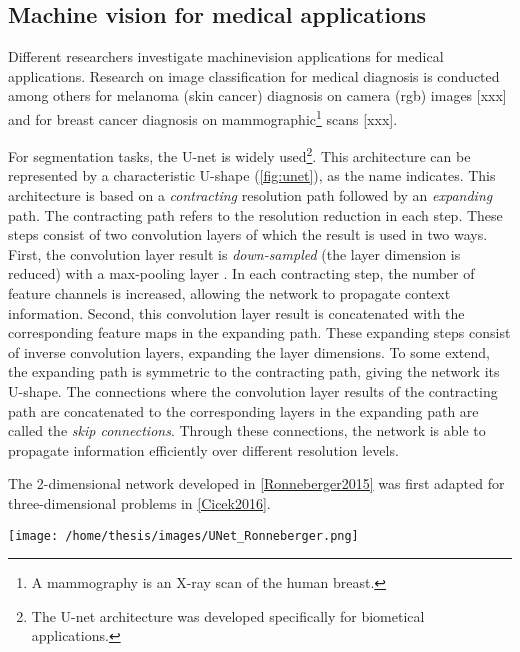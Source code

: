 \subsection{Machine vision for medical applications}
\par{
    Different researchers investigate \Gls{machinevision} applications for medical applications. 
    Research on image classification for medical diagnosis is conducted among others for melanoma (skin cancer) diagnosis on camera (\acrshort{rgb}) images [xxx] 
    and for breast cancer diagnosis on mammographic\footnote{A mammography is an X-ray scan of the human breast.} scans [xxx].
}
\par{
    For segmentation tasks, the U-net \cite{Ronneberger2015} is widely used\footnote{The U-net architecture was developed specifically for biometical applications.}. 
    This architecture can be represented by a characteristic U-shape (\ref{fig:unet}), as the name indicates.
    This architecture is based on a \textit{contracting} resolution path followed by an \textit{expanding} path. 
    The contracting path refers to the resolution reduction in each step. 
    These steps consist of two convolution layers of which the result is used in two ways. 
    First, the convolution layer result is \textit{down-sampled} (the layer dimension is reduced) with a max-pooling layer .
    In each contracting step, the number of feature channels is increased, allowing the network to propagate context information.
    Second, this convolution layer result is concatenated with the corresponding feature maps in the expanding path.
    These expanding steps consist of inverse convolution layers, expanding the layer dimensions. To some extend, the expanding path is symmetric  to the contracting path, giving the network its U-shape. 
    The connections where the convolution layer results of the contracting path are concatenated to the corresponding layers in the expanding path are called the \textit{skip connections}.
    Through these connections, the network is able to propagate information efficiently over different resolution levels.

    The 2-dimensional network developed in \ref{Ronneberger2015} was first adapted for three-dimensional problems in \ref{Cicek2016}.
}
\begin{SCfigure}[][htb]
    \texttt{[image: /home/thesis/images/UNet\_Ronneberger.png]}
    \caption{U-Net architecture, as illustrated in \cite{Ronneberger2015}. 
    Each blue box represents a multi-channel feature-map. 
    The number of channels is indicated above the box, the $x \times y$ dimensions are indicated at the bottom left.
    The gray arrows indicate the feature maps in the contracting path are copied and concatenated to the feature maps of the expanding path.}
    \label{fig:unet}
\end{SCfigure}


